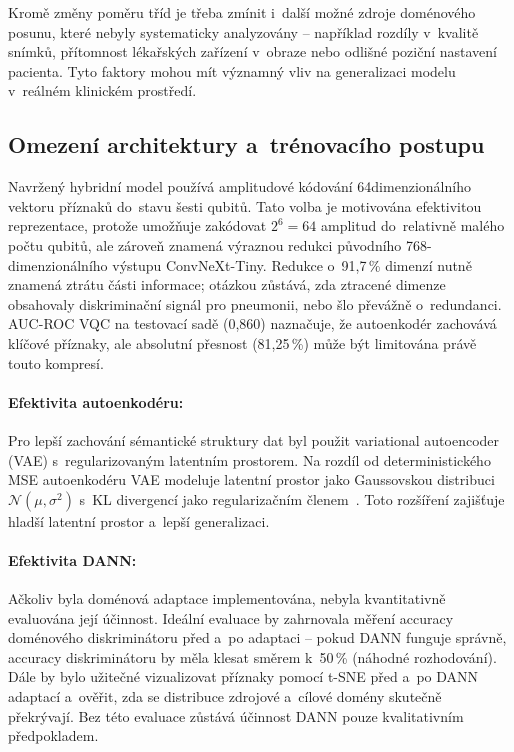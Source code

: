 \documentclass[12pt, a4paper]{report}
\begin{document}
Kromě změny poměru tříd je třeba zmínit i~další možné zdroje doménového posunu, které nebyly systematicky analyzovány – například rozdíly v~kvalitě snímků, přítomnost lékařských zařízení v~obraze nebo odlišné poziční nastavení pacienta. Tyto faktory mohou mít významný vliv na generalizaci modelu v~reálném klinickém prostředí.

\subsection{Omezení architektury a~trénovacího postupu}

Navržený hybridní model používá amplitudové kódování 64dimenzionálního vektoru příznaků do~stavu šesti qubitů. Tato volba je motivována efektivitou reprezentace, protože umožňuje zakódovat $2^6 = 64$ amplitud do~relativně malého počtu qubitů, ale zároveň znamená výraznou redukci původního 768-dimenzionálního výstupu ConvNeXt-Tiny. Redukce o~91{,}7\,\% dimenzí nutně znamená ztrátu části informace; otázkou zůstává, zda ztracené dimenze obsahovaly diskriminační signál pro pneumonii, nebo šlo převážně o~redundanci. AUC-ROC VQC na testovací sadě (0{,}860) naznačuje, že autoenkodér zachovává klíčové příznaky, ale absolutní přesnost (81{,}25\,\%) může být limitována právě touto kompresí.

\paragraph{Efektivita autoenkodéru:} Pro lepší zachování sémantické struktury dat byl použit variational autoencoder (VAE) s~regularizovaným latentním prostorem. Na rozdíl od deterministického MSE autoenkodéru VAE modeluje latentní prostor jako Gaussovskou distribuci $\mathcal{N}(\mu, \sigma^2)$ s~KL divergencí jako regularizačním členem~\cite{kingma_vae}. Toto rozšíření zajišťuje hladší latentní prostor a~lepší generalizaci.

\paragraph{Efektivita DANN:} Ačkoliv byla doménová adaptace implementována, nebyla kvantitativně evaluována její účinnost. Ideální evaluace by zahrnovala měření accuracy doménového diskriminátoru před a~po adaptaci -- pokud DANN funguje správně, accuracy diskriminátoru by měla klesat směrem k~50\,\% (náhodné rozhodování). Dále by bylo užitečné vizualizovat příznaky pomocí t-SNE před a~po DANN adaptací a~ověřit, zda se distribuce zdrojové a~cílové domény skutečně překrývají. Bez této evaluace zůstává účinnost DANN pouze kvalitativním předpokladem.
\end{document}
